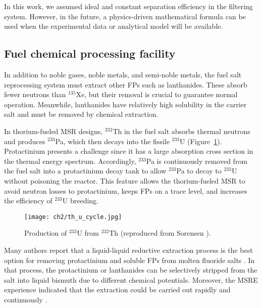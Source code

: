 In this work, we assumed ideal and constant separation efficiency in the 
filtering system. However, in the future, a physics-driven mathematical  
formula can be used when the experimental data or analytical model will be 
available.


\subsection{Fuel chemical processing facility} \label{sec:chemical_processing}
In addition to noble gases, noble metals, and semi-noble metals, the fuel salt 
reprocessing system must extract other \glspl{FP} such as lanthanides. These 
absorb fewer neutrons than $^{135}$Xe, but their removal is crucial to 
guarantee normal operation. Meanwhile, lanthanides have relatively high 
solubility in the carrier salt and must be removed by chemical extraction. 

In thorium-fueled \gls{MSR} designs, $^{232}$Th in the fuel salt absorbs 
thermal neutrons and produces $^{233}$Pa, which then decays into the fissile 
$^{233}$U (Figure~\ref{fig:th_u_reaction}). Protactinium presents a challenge  
since it has a large absorption cross section in the thermal energy spectrum. 
Accordingly, $^{233}$Pa is continuously removed from the fuel salt into a 
protactinium decay tank to allow $^{233}$Pa to decay to $^{233}$U without 
poisoning the reactor. This feature allows the thorium-fueled \gls{MSR} to 
avoid neutron losses to protactinium, keeps \glspl{FP} on a trace level, and 
increases the efficiency of $^{233}$U breeding. 

\begin{figure}[htp!] %
	\centering
	\texttt{[image: ch2/th\_u\_cycle.jpg]}
	\caption{Production of $^{233}$U from $^{232}$Th  (reproduced from 
	Sorensen \cite{sorensen_one-fluid_2006}).}
	\label{fig:th_u_reaction}
\end{figure}

Many authors report that a liquid-liquid reductive extraction process is the 
best option for removing protactinium and soluble \glspl{FP} from 
molten fluoride salts \cite{briggs_molten-salt_1969, delpech_molten_2010, 
doligez_coupled_2014}. In that process, the protactinium or lanthanides can be 
selectively stripped from the salt into liquid bismuth due to different  
chemical potentials. Moreover, the \gls{MSRE} experience indicated that the 
extraction could be carried out rapidly and continuously  
\cite{whatley_engineering_1970}.

